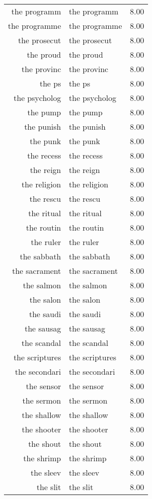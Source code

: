 \begin{table}[ht]
\begin{tabular}{rlr}
  the programm & the programm & 8.00 \\ 
  the programme & the programme & 8.00 \\ 
  the prosecut & the prosecut & 8.00 \\ 
  the proud & the proud & 8.00 \\ 
  the provinc & the provinc & 8.00 \\ 
  the ps & the ps & 8.00 \\ 
  the psycholog & the psycholog & 8.00 \\ 
  the pump & the pump & 8.00 \\ 
  the punish & the punish & 8.00 \\ 
  the punk & the punk & 8.00 \\ 
  the recess & the recess & 8.00 \\ 
  the reign & the reign & 8.00 \\ 
  the religion & the religion & 8.00 \\ 
  the rescu & the rescu & 8.00 \\ 
  the ritual & the ritual & 8.00 \\ 
  the routin & the routin & 8.00 \\ 
  the ruler & the ruler & 8.00 \\ 
  the sabbath & the sabbath & 8.00 \\ 
  the sacrament & the sacrament & 8.00 \\ 
  the salmon & the salmon & 8.00 \\ 
  the salon & the salon & 8.00 \\ 
  the saudi & the saudi & 8.00 \\ 
  the sausag & the sausag & 8.00 \\ 
  the scandal & the scandal & 8.00 \\ 
  the scriptures & the scriptures & 8.00 \\ 
  the secondari & the secondari & 8.00 \\ 
  the sensor & the sensor & 8.00 \\ 
  the sermon & the sermon & 8.00 \\ 
  the shallow & the shallow & 8.00 \\ 
  the shooter & the shooter & 8.00 \\ 
  the shout & the shout & 8.00 \\ 
  the shrimp & the shrimp & 8.00 \\ 
  the sleev & the sleev & 8.00 \\ 
  the slit & the slit & 8.00 \\ 

\end{tabular}
\end{table}
